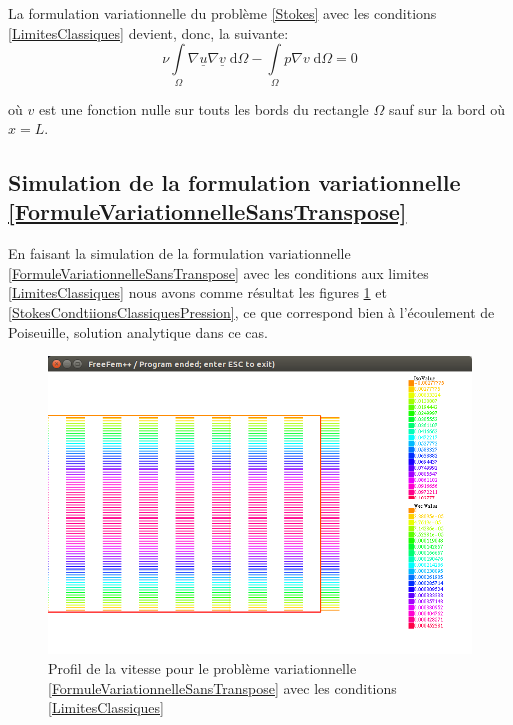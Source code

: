 \documentclass[11pt,a4paper]{article}
\numberwithin{equation}{subsection}
\numberwithin{figure}{subsection}
\begin{document}
La formulation variationnelle du problème \ref{Stokes} avec les conditions \ref{LimitesClassiques} devient, donc, la suivante:
\begin{equation}
\nu \int\limits_\Omega \nabla \underline{u} \nabla \underline{v} \;\mathrm{d}\Omega - \int\limits_\Omega p\nabla v \; \mathrm{d}\Omega = 0 \label{FormuleVariationnelleSansTranspose}
\end{equation}

où $v$ est une fonction nulle sur touts les bords du rectangle $\Omega$ sauf sur la bord où $x = L$.

\subsection{Simulation de la formulation variationnelle \ref{FormuleVariationnelleSansTranspose}}

En faisant la simulation de la formulation variationnelle \ref{FormuleVariationnelleSansTranspose} avec les conditions aux limites \ref{LimitesClassiques} nous avons comme résultat les figures \ref{StokesConditionsClassiques} et \ref{StokesCondtiionsClassiquesPression}, ce que correspond bien à l'écoulement de Poiseuille, solution analytique dans ce cas.

\begin{figure}[H]
\centering
\includegraphics[scale=0.4]{StokesConditionsClassiques.png}
\caption{Profil de la vitesse pour le problème variationnelle \ref{FormuleVariationnelleSansTranspose} avec les conditions \ref{LimitesClassiques}}
\label{StokesConditionsClassiques}
\end{figure}
\end{document}
